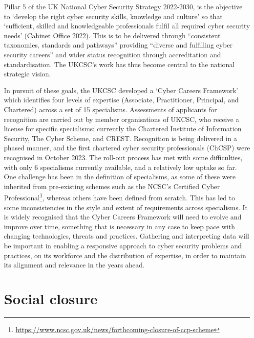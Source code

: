 \documentclass[
  a4paper,
]{book}
\begin{document}
Pillar 5 of the UK National Cyber Security Strategy 2022-2030, is the
objective to `develop the right cyber security skills, knowledge and
culture' so that `sufficient, skilled and knowledgeable professionals
fulfil all required cyber security needs' (Cabinet Office 2022). This is
to be delivered through ``consistent taxonomies, standards and
pathways'' providing ``diverse and fulfilling cyber security careers''
and wider status recognition through accreditation and standardisation.
The UKCSC's work has thus become central to the national strategic
vision.

In pursuit of these goals, the UKCSC developed a `Cyber Careers
Framework' which identifies four levels of expertise (Associate,
Practitioner, Principal, and Chartered) across a set of 15 specialisms.
Assessments of applicants for recognition are carried out by member
organisations of UKCSC, who receive a license for specific specialisms:
currently the Chartered Institute of Information Security, The Cyber
Scheme, and CREST. Recognition is being delivered in a phased manner,
and the first chartered cyber security professionals (ChCSP) were
recognised in October 2023. The roll-out process has met with some
difficulties, with only 6 specialisms currently available, and a
relatively low uptake so far. One challenge has been in the definition
of specialisms, as some of these were inherited from pre-existing
schemes such as the NCSC's Certified Cyber Professional\footnote{\url{https://www.ncsc.gov.uk/news/forthcoming-closure-of-ccp-scheme}},
whereas others have been defined from scratch. This has led to some
inconsistencies in the style and extent of requirements across
specialisms. It is widely recognised that the Cyber Careers Framework
will need to evolve and improve over time, something that is necessary
in any case to keep pace with changing technologies, threats and
practices. Gathering and interpreting data will be important in enabling
a responsive approach to cyber security problems and practices, on its
workforce and the distribution of expertise, in order to maintain its
alignment and relevance in the years ahead.

\section{Social closure}\label{social-closure}
\end{document}
